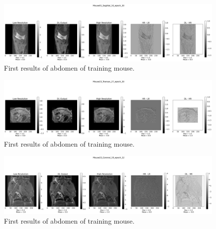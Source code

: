 \documentclass[twocolumn]{article}
\begin{document}
\begin{figure}
    \centering
    \includegraphics[width=1\linewidth]{Mouse01_Sagittal_16_epoch_10.png}
    \caption{First results of abdomen of training mouse.}
    \label{fig:first_sagittal}
\end{figure}

\begin{figure}
    \centering
    \includegraphics[width=1\linewidth]{Mouse23_Transax_27_epoch_10.png}
    \caption{First results of abdomen of training mouse.}
    \label{fig:first_transax}
\end{figure}

\begin{figure}
    \centering
    \includegraphics[width=1\linewidth]{Mouse23_Coronal_19_epoch_12.png}
    \caption{First results of abdomen of training mouse.}
    \label{fig:first_coronal}
\end{figure}

\begin{table}[h]
    \centering
    \caption{\label{tab:mouse_distribution} Mouse distribution across training, validation, and testing sets.}
\end{table}
\end{document}

